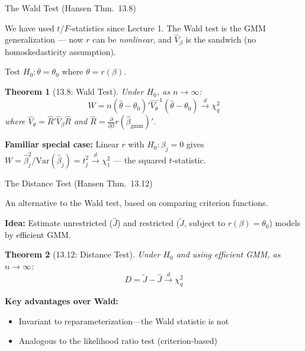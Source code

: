 \documentclass[aspectratio=169, handout]{beamer}
\newtheorem{thm}{Theorem}
\numberwithin{equation}{section}
\begin{document}
\begin{frame}{The Wald Test (Hansen Thm.~13.8)}

We have used $t$/$F$-statistics since Lecture 1. The Wald test is the GMM generalization --- now $r$ can be \textit{nonlinear}, and $\hat V_\beta$ is the sandwich (no homoskedasticity assumption).

\smallskip
Test $H_0: \theta = \theta_0$ where $\theta = r(\beta)$.

\begin{thm}[13.8: Wald Test]
Under $H_0$, as $n \to \infty$:
$$W = n(\hat\theta - \theta_0)'\hat V_\theta^{-1}(\hat\theta - \theta_0) \xrightarrow{d} \chi^2_q$$
where $\hat V_\theta = \hat R'\hat V_\beta \hat R$ and $\hat R = \frac{\partial}{\partial \beta}r(\hat\beta_{\text{gmm}})'$.
\end{thm}

\smallskip
\textbf{Familiar special case:} Linear $r$ with $H_0: \beta_j = 0$ gives $W = \hat\beta_j^2 / \widehat{\text{Var}}(\hat\beta_j) = t_j^2 \xrightarrow{d} \chi^2_1$ --- the squared $t$-statistic.

\end{frame}

\begin{frame}{The Distance Test (Hansen Thm.~13.12)}

An alternative to the Wald test, based on comparing criterion functions.

\smallskip
\textbf{Idea:} Estimate unrestricted ($\hat J$) and restricted ($\tilde J$, subject to $r(\beta)=\theta_0$) models by efficient GMM.

\begin{thm}[13.12: Distance Test]
Under $H_0$ and using efficient GMM, as $n \to \infty$:
$$D = \tilde J - \hat J \xrightarrow{d} \chi^2_q$$
\end{thm}

\smallskip
\textbf{Key advantages over Wald:}
\begin{itemize}\itemsep=1pt
\item \alert{Invariant to reparameterization}---the Wald statistic is not
\item Analogous to the likelihood ratio test (criterion-based)
\end{itemize}

\end{frame}
\end{document}
